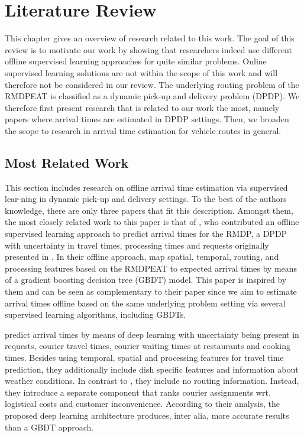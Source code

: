 \chapter{Literature Review}
\label{chap:review}
This chapter gives an overview of research related to this work. The goal of this review is to motivate our work by showing that researchers indeed use different offline supervised learning approaches for quite similar problems. Online supervised learning solutions are not within the scope of this work and will therefore not be considered in our review. The underlying routing problem of the RMDPEAT is classified as a dynamic pick-up and delivery problem (DPDP). We therefore first present research that is related to our work the most, namely papers where arrival times are estimated in DPDP settings. Then, we broaden the scope to research in arrival time estimation for vehicle routes in general.

\section{Most Related Work}
\label{sec:msr}
This section includes research on offline arrival time estimation via supervised lear-ning in dynamic pick-up and delivery settings.
To the best of the authors knowledge, there are only three papers that fit this description. Amongst them, the most closely related work to this paper is that of \citet{Hildebrandt2020_EAT}, who contributed an offline supervised learning approach to predict arrival times for the RMDP, a DPDP with uncertainty in travel times, processing times and requests originally presented in \citet{UlmerRMDP}.
In their offline approach, \citet{Hildebrandt2020_EAT} map spatial, temporal, routing, and processing features based on the RMDPEAT to expected arrival times by means of a gradient boosting decision tree (GBDT) model. This paper is inspired by them and can be seen as complementary to their paper since we aim to estimate arrival times offline based on the same underlying problem setting via several supervised learning algorithms, including GBDTs.

\citet{Zhu2020_OFCTE_DL} predict arrival times by means of deep learning with uncertainty being present in requests, courier travel times, courier waiting times at restaurants and cooking times. Besides using temporal, spatial and processing features for travel time prediction, they additionally include dish specific features and information about weather conditions. In contrast to \citet{Hildebrandt2020_EAT}, they include no routing information. Instead, they introduce a separate component that ranks courier assignments wrt. logistical costs and customer inconvenience. According to their analysis, the proposed deep learning architecture produces, inter alia, more accurate results than a GBDT approach.

